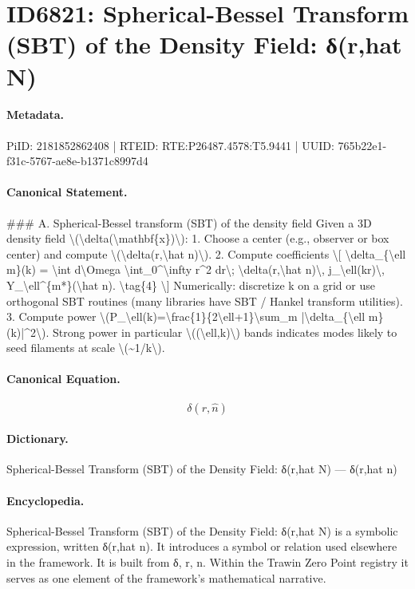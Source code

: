 \section*{ID6821: Spherical-Bessel Transform (SBT) of the Density Field: δ(r,hat N)}
\paragraph{Metadata.}
PiID: 2181852862408 | RTEID: RTE:P26487.4578:T5.9441 | UUID: 765b22e1-f31c-5767-ae8e-b1371c8997d4

\paragraph{Canonical Statement.}
\#\#\# A. Spherical-Bessel transform (SBT) of the density field Given a 3D density field \textbackslash{}(\textbackslash{}delta(\textbackslash{}mathbf\{x\})\textbackslash{}): 1. Choose a center (e.g., observer or box center) and compute \textbackslash{}(\textbackslash{}delta(r,\textbackslash{}hat n)\textbackslash{}). 2. Compute coefficients \textbackslash{}[ \textbackslash{}delta\_\{\textbackslash{}ell m\}(k) = \textbackslash{}int d\textbackslash{}Omega \textbackslash{}int\_0\textasciicircum{}\textbackslash{}infty r\textasciicircum{}2 dr\textbackslash{}; \textbackslash{}delta(r,\textbackslash{}hat n)\textbackslash{}, j\_\textbackslash{}ell(kr)\textbackslash{}, Y\_\textbackslash{}ell\textasciicircum{}\{m*\}(\textbackslash{}hat n). \textbackslash{}tag\{4\} \textbackslash{}] Numerically: discretize k on a grid or use orthogonal SBT routines (many libraries have SBT / Hankel transform utilities). 3. Compute power \textbackslash{}(P\_\textbackslash{}ell(k)=\textbackslash{}frac\{1\}\{2\textbackslash{}ell+1\}\textbackslash{}sum\_m |\textbackslash{}delta\_\{\textbackslash{}ell m\}(k)|\textasciicircum{}2\textbackslash{}). Strong power in particular \textbackslash{}((\textbackslash{}ell,k)\textbackslash{}) bands indicates modes likely to seed filaments at scale \textbackslash{}(\textasciitilde{}1/k\textbackslash{}).

\paragraph{Canonical Equation.}
\[
\delta(r,\hat n)
\]

\paragraph{Dictionary.}
Spherical-Bessel Transform (SBT) of the Density Field: δ(r,hat N) — δ(r,hat n)

\paragraph{Encyclopedia.}
Spherical-Bessel Transform (SBT) of the Density Field: δ(r,hat N) is a symbolic expression, written δ(r,hat n). It introduces a symbol or relation used elsewhere in the framework. It is built from δ, r, n. Within the Trawin Zero Point registry it serves as one element of the framework's mathematical narrative.
